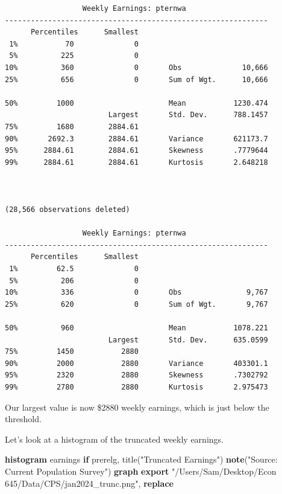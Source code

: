\documentclass[
]{book}
\newenvironment{Shaded}{\begin{snugshade}}{\end{snugshade}}
\newcommand{\BaseNTok}[1]{\textcolor[rgb]{0.00,0.00,0.81}{#1}}
\newcommand{\KeywordTok}[1]{\textcolor[rgb]{0.13,0.29,0.53}{\textbf{#1}}}
\newcommand{\NormalTok}[1]{#1}
\newcommand{\StringTok}[1]{\textcolor[rgb]{0.31,0.60,0.02}{#1}}
\begin{document}
\begin{verbatim}
                  Weekly Earnings: pternwa
-------------------------------------------------------------
      Percentiles      Smallest
 1%           70              0
 5%          225              0
10%          360              0       Obs              10,666
25%          656              0       Sum of Wgt.      10,666

50%         1000                      Mean           1230.474
                        Largest       Std. Dev.      788.1457
75%         1680        2884.61
90%       2692.3        2884.61       Variance       621173.7
95%      2884.61        2884.61       Skewness       .7779644
99%      2884.61        2884.61       Kurtosis       2.648218



(28,566 observations deleted)

                  Weekly Earnings: pternwa
-------------------------------------------------------------
      Percentiles      Smallest
 1%         62.5              0
 5%          206              0
10%          336              0       Obs               9,767
25%          620              0       Sum of Wgt.       9,767

50%          960                      Mean           1078.221
                        Largest       Std. Dev.      635.0599
75%         1450           2880
90%         2000           2880       Variance       403301.1
95%         2320           2880       Skewness       .7302792
99%         2780           2880       Kurtosis       2.975473
\end{verbatim}

Our largest value is now \$2880 weekly earnings, which is just below the threshold.

Let's look at a histogram of the truncated weekly earnings.

\begin{Shaded}
\begin{Highlighting}[]
\KeywordTok{histogram}\NormalTok{ earnings }\KeywordTok{if}\NormalTok{ prerelg, }\BaseNTok{title}\NormalTok{(}\StringTok{"Truncated Earnings"}\NormalTok{) }\KeywordTok{note}\NormalTok{(}\StringTok{"Source: Current Population Survey"}\NormalTok{)}
\KeywordTok{graph} \KeywordTok{export} \StringTok{"/Users/Sam/Desktop/Econ 645/Data/CPS/jan2024\_trunc.png"}\NormalTok{, }\KeywordTok{replace}
\end{Highlighting}
\end{Shaded}
\end{document}
